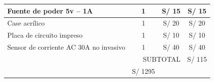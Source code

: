 \documentclass[11pt]{charter}
\begin{document}
\begin{table}[ht]
\begin{tabularx}{\linewidth}{@{}|X|c|r|r|@{}}
 Fuente de poder 5v – 1A &
  \multicolumn{1}{c|}{1} &
  \multicolumn{1}{c|}{S/ 15} &
  \multicolumn{1}{c|}{S/ 15} \\ \hline
  Case acrílico&
  \multicolumn{1}{c|}{1} &
  \multicolumn{1}{c|}{S/ 20} &
  \multicolumn{1}{c|}{S/ 20} \\ \hline
  Placa de circuito impreso &
  \multicolumn{1}{c|}{1} &
  \multicolumn{1}{c|}{S/ 10} &
  \multicolumn{1}{c|}{S/ 10} \\ \hline
  Sensor de corriente AC 30A no invasivo &
  \multicolumn{1}{c|}{1} &
  \multicolumn{1}{c|}{S/ 40} &
  \multicolumn{1}{c|}{S/ 40} \\ \hline
\multicolumn{3}{|r|}{SUBTOTAL} &
  \multicolumn{1}{c|}{S/ 115} \\ \hline
\rowcolor[HTML]{C0C0C0}
\multicolumn{3}{|r|}{SUBTOTAL} &
  \multicolumn{1}{c|}{S/ 1295} \\ \hline
  \end{tabularx}%
\end{table}
  
\end{document}
